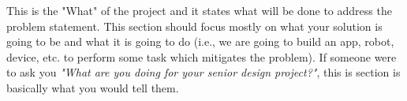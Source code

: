 This is the "What" of the project and it states what will be done to address the problem statement. This section should focus mostly on what your solution is going to be and what it is going to do (i.e., we are going to build an app, robot, device, etc. to perform some task which mitigates the problem). If someone were to ask you \textit{"What are you doing for your senior design project?"}, this is section is basically what you would tell them.